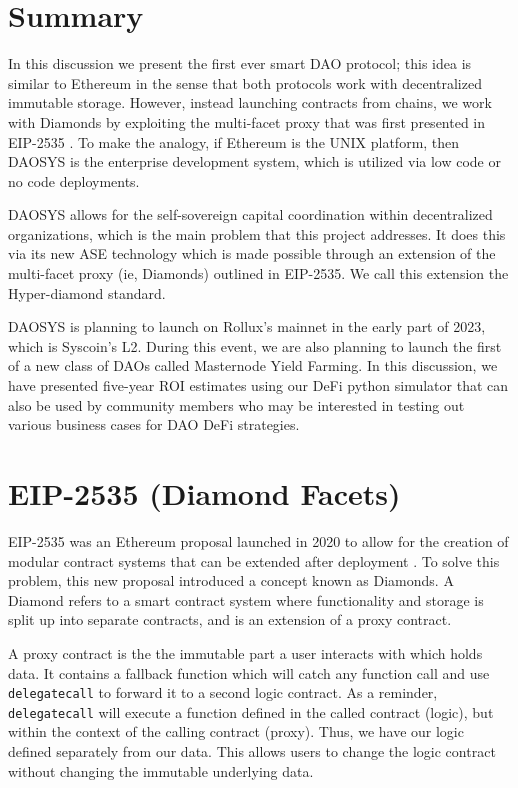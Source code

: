 \documentclass[journal,twocolumn,12pt]{ieeesyscoin}
\begin{document}
\section{Summary}
\label{section:summary}

In this discussion we present the first ever smart DAO protocol; this idea is similar to Ethereum in the sense that both protocols work with decentralized immutable storage. However, instead launching contracts from chains, we work with Diamonds by exploiting the multi-facet proxy that was first presented in EIP-2535 \cite{Mud20}. To make the analogy, if Ethereum is the UNIX platform, then DAOSYS is the enterprise development system, which is utilized via low code or no code deployments.

DAOSYS allows for the self-sovereign capital coordination within decentralized organizations, which is the main problem that this project addresses. It does this via its new ASE technology which is made possible through an extension of the multi-facet proxy (ie, Diamonds) outlined in EIP-2535. We call this extension the Hyper-diamond standard.

DAOSYS is planning to launch on Rollux's mainnet in the early part of 2023, which is Syscoin's L2. During this event, we are also planning to launch the first of a new class of DAOs called Masternode Yield Farming. In this discussion, we have presented five-year ROI estimates using our DeFi python simulator that can also be used by community members who may be interested in testing out various business cases for DAO DeFi strategies. 

\appendices

\section{EIP-2535 (Diamond Facets)}
\label{sec:diamond}

EIP-2535 was an Ethereum proposal launched in 2020 to allow for the creation of modular contract systems that can be extended after deployment \cite{Mud20}. To solve this problem, this new proposal introduced a concept known as Diamonds. A Diamond refers to a smart contract system where functionality and storage is split up into separate contracts, and is an extension of a proxy contract.

A proxy contract is the the immutable part a user interacts with which holds data. It contains a fallback function which will catch any function call and use \texttt{delegatecall} to forward it to a second logic contract. As a reminder, \texttt{delegatecall} will execute a function defined in the called contract (logic), but within the context of the calling contract (proxy). Thus, we have our logic defined separately from our data. This allows users to change the logic contract without changing the immutable underlying data. 
\end{document}
